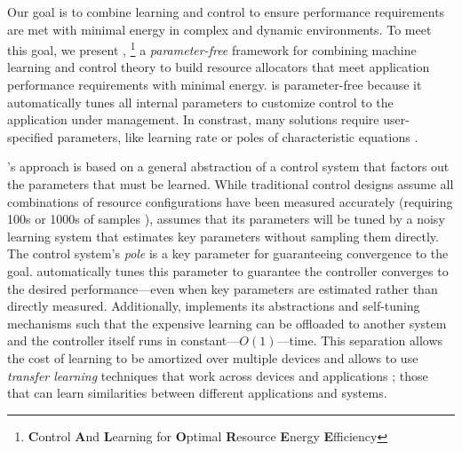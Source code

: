 Our goal is to combine learning and control to ensure performance
requirements are met with minimal energy in complex and dynamic
environments.  To meet this goal, we present \SYSTEM{},
\footnote{\textbf{C}ontrol \textbf{A}nd \textbf{L}earning for
  \textbf{O}ptimal \textbf{R}esource \textbf{E}nergy
  \textbf{E}fficiency} a \emph{parameter-free} framework for combining
machine learning and control theory to build resource allocators that
meet application performance requirements with minimal energy.
\SYSTEM{} is parameter-free because it automatically tunes all
internal parameters to customize control to the application under
management.  In constrast, many solutions require user-specified
parameters, like learning rate \cite{dubach2010} or poles of
characteristic equations \cite{ControlWare}.


\SYSTEM{}'s approach is based on a general abstraction of a control
system that factors out the parameters that must be learned.  While
traditional control designs assume all combinations of resource
configurations have been measured accurately (requiring 100s or 1000s
of samples \cite{}), \SYSTEM{} assumes that its parameters will be
tuned by a noisy learning system that estimates key parameters without
sampling them directly.  The control system's \emph{pole} is a key
parameter for guaranteeing convergence to the goal.  \SYSTEM{}
automatically tunes this parameter to guarantee the controller
converges to the desired performance---even when key parameters are
estimated rather than directly measured.  Additionally, \SYSTEM{}
implements its abstractions and self-tuning mechanisms such that the
expensive learning can be offloaded to another system and the
controller itself runs in constant---$O(1)$---time.  This separation
allows the cost of learning to be amortized over multiple devices and
allows \SYSTEM{} to use \emph{transfer learning} techniques that work
across devices and applications \cite{transferlearning}; \ie{} those
that can learn similarities between different applications and
systems.




